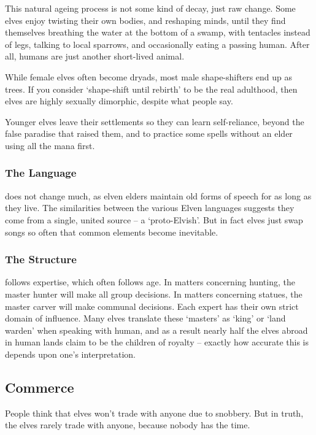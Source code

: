 This natural ageing process is not some kind of decay, just raw change.
Some elves enjoy twisting their own bodies, and reshaping minds, until they find themselves breathing the water at the bottom of a swamp, with tentacles instead of legs, talking to local sparrows, and occasionally eating a passing human.
After all, humans are just another short-lived animal.

While female elves often become \glspl{dryad}, most male shape-shifters end up as trees.
If you consider `shape-shift until rebirth' to be the real adulthood, then elves are highly sexually dimorphic, despite what people say.

Younger elves leave their settlements so they can learn self-reliance, beyond the false paradise that raised them, and to practice some \glspl{spell} without an elder using all the mana first.

\subsubsection[The Elven Language]{The Language}
does not change much, as elven elders maintain old forms of speech for as long as they live.
The similarities between the various Elven languages suggests they come from a single, united source -- a `proto-Elvish'.
But in fact elves just swap songs so often that common elements become inevitable.

\subsubsection{The Structure}
follows expertise, which often follows age.
In matters concerning hunting, the master hunter will make all group decisions.
In matters concerning statues, the master carver will make communal decisions.
Each expert has their own strict domain of influence.
Many elves translate these `masters' as `king' or `land warden' when speaking with human, and as a result nearly half the elves abroad in human lands claim to be the children of royalty -- exactly how accurate this is depends upon one's interpretation.

\subsection{Commerce}

People think that elves won't trade with anyone due to snobbery.
But in truth, the elves rarely trade with anyone, because nobody has the time.

